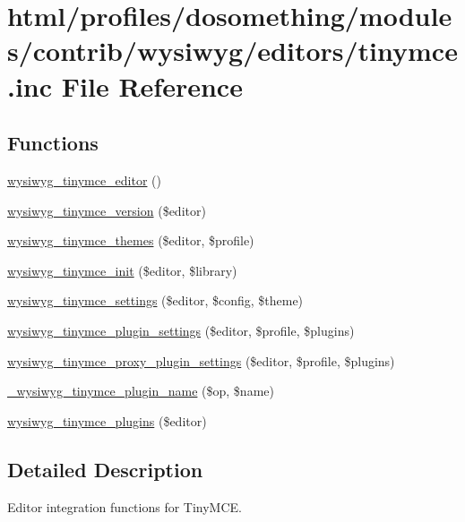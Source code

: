 \hypertarget{tinymce_8inc}{
\section{html/profiles/dosomething/modules/contrib/wysiwyg/editors/tinymce.inc File Reference}
\label{tinymce_8inc}
}
\subsection*{Functions}
\begin{DoxyCompactItemize}
\item 
\hyperlink{tinymce_8inc_a20ecffb8ac4c4df58bf2bcbada9dac13}{wysiwyg\_\-tinymce\_\-editor} ()
\item 
\hyperlink{tinymce_8inc_a2c23ae7b392dc9ea5ab00526b7b54a54}{wysiwyg\_\-tinymce\_\-version} (\$editor)
\item 
\hyperlink{tinymce_8inc_a3747f3017d77d34701e9c095a9298f52}{wysiwyg\_\-tinymce\_\-themes} (\$editor, \$profile)
\item 
\hyperlink{tinymce_8inc_a85d07084954b0a9d004e0491a07d424b}{wysiwyg\_\-tinymce\_\-init} (\$editor, \$library)
\item 
\hyperlink{tinymce_8inc_ad053d3f07a709b88d646ec81bd16fd94}{wysiwyg\_\-tinymce\_\-settings} (\$editor, \$config, \$theme)
\item 
\hyperlink{tinymce_8inc_ace36464c11cfbdbf7bc5eb6fc094d7a3}{wysiwyg\_\-tinymce\_\-plugin\_\-settings} (\$editor, \$profile, \$plugins)
\item 
\hyperlink{tinymce_8inc_a8a7984820a5db3e3db37f2e88d7b155b}{wysiwyg\_\-tinymce\_\-proxy\_\-plugin\_\-settings} (\$editor, \$profile, \$plugins)
\item 
\hyperlink{tinymce_8inc_a180b1846fb5918efa67ce09059efb41e}{\_\-wysiwyg\_\-tinymce\_\-plugin\_\-name} (\$op, \$name)
\item 
\hyperlink{tinymce_8inc_ad2b3ed45661a78cc4ec8bb66c54c4a6c}{wysiwyg\_\-tinymce\_\-plugins} (\$editor)
\end{DoxyCompactItemize}


\subsection{Detailed Description}
Editor integration functions for TinyMCE. 

